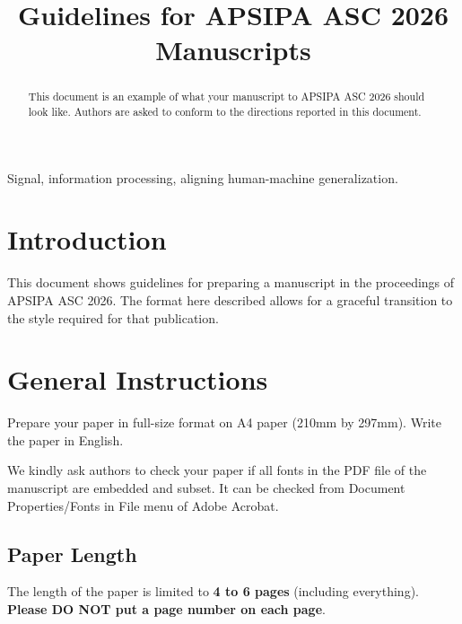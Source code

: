 \documentclass[conference,a4paper]{APSIPA2026}
\begin{document}
\title{Guidelines for APSIPA ASC 2026 Manuscripts}

\author{


}

\maketitle
\thispagestyle{firststyle}
\pagestyle{empty}

\begin{abstract}
  This document is an example of what your manuscript to APSIPA ASC 2026 should look like.
  Authors are asked to conform to the directions reported in this document.
\end{abstract}

\begin{IEEEkeywords}
  Signal, information processing, aligning human-machine generalization. 
\end{IEEEkeywords} 

\section{Introduction}
This document shows guidelines for preparing a manuscript in the proceedings of APSIPA ASC 2026.
The format here described allows for a graceful transition to the style required for that publication.

\section{General Instructions}
Prepare your paper in full-size format on A4 paper (210mm by 297mm).
Write the paper in English.

We kindly ask authors to check your paper if all fonts in the PDF file of the manuscript are embedded and subset.
It can be checked from Document Properties/Fonts in File menu of Adobe Acrobat.

\subsection{Paper Length}
The length of the paper is limited to {\bf 4 to 6 pages} (including everything).
{\bf Please DO NOT put a page number on each page}.
\end{document}
